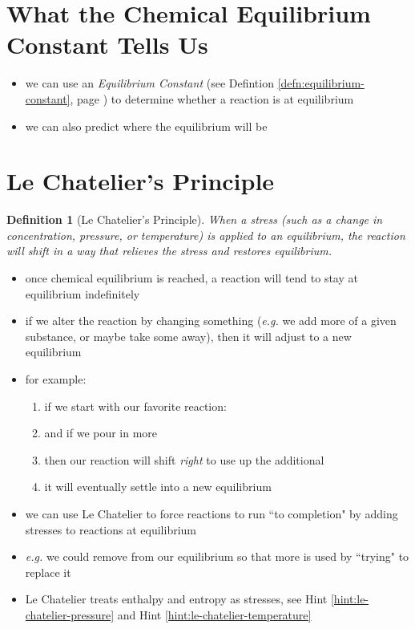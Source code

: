 \documentclass[11pt, oneside]{article}   	%
\newtheorem{definition}{Definition}
\begin{document}
\section{What the Chemical Equilibrium Constant Tells Us}
\begin{itemize}
\item we can use an \emph{Equilibrium Constant} (see Defintion \ref{defn:equilibrium-constant}, page \pageref{defn:equilibrium-constant}) to determine whether a reaction is at equilibrium
\item we can also predict where the equilibrium will be
\end{itemize}

\section{Le Chatelier's Principle}

\begin{definition}[Le Chatelier's Principle]\label{defn:le-chatelier}
When a \emph{stress} (such as a change in concentration, pressure, or temperature) is applied to an equilibrium,
the reaction will shift in a way that relieves the stress and restores equilibrium.
\end{definition}

\begin{itemize}
\item once chemical equilibrium is reached, a reaction will tend to stay at equilibrium indefinitely
\item if we alter the reaction by changing something (\emph{e.g.} we add more of a given substance, or maybe take some away), then it will adjust to a new equilibrium
\item for example:
\begin{enumerate}
\item if we start with our favorite reaction:\\ \begin{center}\end{center}
\item and if we pour in more 
\item then our reaction will shift \emph{right} to use up the additional 
\item it will eventually settle into a new equilibrium
\end{enumerate}
\item we can use Le Chatelier to force reactions to run ``to completion" by adding stresses to reactions at equilibrium
\item \emph{e.g.} we could remove  from our equilibrium so that more  is used by ``trying" to replace it
\item Le Chatelier treats enthalpy and entropy as stresses, see Hint \ref{hint:le-chatelier-pressure} and Hint \ref{hint:le-chatelier-temperature}
\end{itemize}
\end{document}
